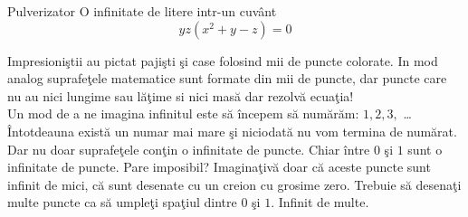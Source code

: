 \begin{surferPage}{Pulverizator}
O infinitate de litere intr-un cuv\^ant\\
\smallskip
\[y z (x^2	+ y - z)	= 0\]

\vspace{0.3cm}
Impresioni\c stii au pictat paji\c sti \c si case folosind mii de puncte colorate. In mod analog suprafe\c tele matematice sunt formate din mii de puncte, dar
puncte care nu au nici lungime sau l\u a\c time si nici mas\u a dar rezolv\u a ecua\c tia! \\
\vspace{0.3cm}
Un mod de a ne imagina infinitul este s\u a \^incepem s\u a num\u ar\u am: $1, 2, 3,$ \dots\\
\^Intotdeauna exist\u a un numar mai mare \c si niciodat\u a nu vom termina de num\u arat.\\
\vspace{0.3cm}
Dar nu doar suprafe\c tele con\c tin o infinitate de puncte. Chiar \^intre $0$ \c si $1$ sunt o infinitate de puncte.
Pare imposibil? Imagina\c tiv\u a doar c\u a aceste puncte sunt infinit de mici, c\u a sunt desenate cu un creion cu grosime zero.
Trebuie s\u a desena\c ti multe puncte ca s\u a umple\c ti spa\c tiul dintre $0$ \c si $1$. Infinit de multe.
\end{surferPage}
